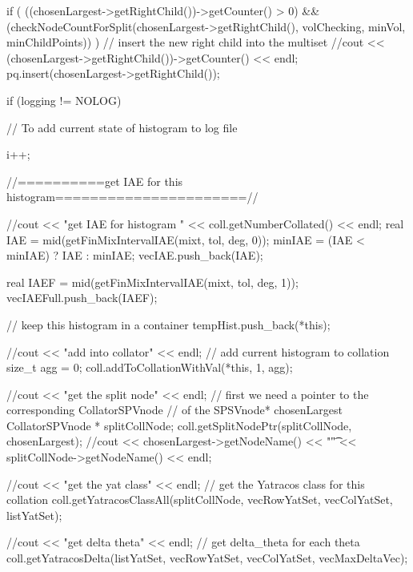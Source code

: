 \begin{DoxyCode}
{{{            if ( ((chosenLargest->getRightChild())->getCounter() > 0) 
            && (checkNodeCountForSplit(chosenLargest->getRightChild(),
                    volChecking, minVol, minChildPoints)) ) {
                // insert the new right child into the multiset
               //cout << (chosenLargest->getRightChild())->getCounter()  <<
       endl;
                pq.insert(chosenLargest->getRightChild());
            }

            if (logging != NOLOG) {
                // To add current state of histogram to log file               
          
                i++;
            }

          //==========get IAE for this histogram======================//
         
        //cout << "get IAE for histogram " << coll.getNumberCollated() << endl;
        real IAE = mid(getFinMixIntervalIAE(mixt, tol, deg, 0));
        minIAE = (IAE < minIAE) ? IAE : minIAE;
        vecIAE.push_back(IAE); 
        
        real IAEF = mid(getFinMixIntervalIAE(mixt, tol, deg, 1));
        vecIAEFull.push_back(IAEF); 

        // keep this histogram in a container 
        tempHist.push_back(*this);
        
        //cout << "add into collator" << endl;
        // add current histogram to collation
        size_t agg = 0;
        coll.addToCollationWithVal(*this, 1, agg);
          
        //cout << "get the split node" << endl;
        // first we need a pointer to the corresponding CollatorSPVnode 
        // of the SPSVnode* chosenLargest     
        CollatorSPVnode * splitCollNode;
        coll.getSplitNodePtr(splitCollNode, chosenLargest);
        //cout << chosenLargest->getNodeName() << "\t" <<
       splitCollNode->getNodeName() << endl;
        
        //cout << "get the yat class" << endl;
        // get the Yatracos class for this collation
        coll.getYatracosClassAll(splitCollNode, vecRowYatSet,
                            vecColYatSet, listYatSet);

        //cout << "get delta theta" << endl;
        // get delta_theta for each theta
        coll.getYatracosDelta(listYatSet, vecRowYatSet, vecColYatSet, 
                        vecMaxDeltaVec);

}}}
\end{DoxyCode}
